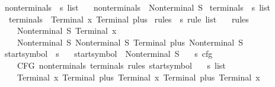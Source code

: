 \begin{isabellebody}
\ nonterminals\ {\isacharcolon}{\kern0pt}{\isacharcolon}{\kern0pt}\ {\isachardoublequoteopen}s\ list{\isachardoublequoteclose}\ \isanewline
\ \ {\isachardoublequoteopen}nonterminals\ {\isacharequal}{\kern0pt}\ {\isacharbrackleft}{\kern0pt}Nonterminal\ S{\isacharbrackright}{\kern0pt}{\isachardoublequoteclose}\isanewline
\isanewline
{}\isamarkupfalse%
\ terminals\ {\isacharcolon}{\kern0pt}{\isacharcolon}{\kern0pt}\ {\isachardoublequoteopen}s\ list{\isachardoublequoteclose}\ \isanewline
\ \ {\isachardoublequoteopen}terminals\ {\isacharequal}{\kern0pt}\ {\isacharbrackleft}{\kern0pt}Terminal\ x{\isacharcomma}{\kern0pt}\ Terminal\ plus{\isacharbrackright}{\kern0pt}{\isachardoublequoteclose}\isanewline
\isanewline
{}\isamarkupfalse%
\ rules\ {\isacharcolon}{\kern0pt}{\isacharcolon}{\kern0pt}\ {\isachardoublequoteopen}s\ rule\ list{\isachardoublequoteclose}\ \isanewline
\ \ {\isachardoublequoteopen}rules\ {\isacharequal}{\kern0pt}\ {\isacharbrackleft}{\kern0pt}\isanewline
\ \ \ \ {\isacharparenleft}{\kern0pt}Nonterminal\ S{\isacharcomma}{\kern0pt}\ {\isacharbrackleft}{\kern0pt}Terminal\ x{\isacharbrackright}{\kern0pt}{\isacharparenright}{\kern0pt}{\isacharcomma}{\kern0pt}\isanewline
\ \ \ \ {\isacharparenleft}{\kern0pt}Nonterminal\ S{\isacharcomma}{\kern0pt}\ {\isacharbrackleft}{\kern0pt}Nonterminal\ S{\isacharcomma}{\kern0pt}\ Terminal\ plus{\isacharcomma}{\kern0pt}\ Nonterminal\ S{\isacharbrackright}{\kern0pt}{\isacharparenright}{\kern0pt}\isanewline
\ \ {\isacharbrackright}{\kern0pt}{\isachardoublequoteclose}\isanewline
\isanewline
{}\isamarkupfalse%
\ start{\isacharunderscore}{\kern0pt}symbol\ {\isacharcolon}{\kern0pt}{\isacharcolon}{\kern0pt}\ s\ \isanewline
\ \ {\isachardoublequoteopen}start{\isacharunderscore}{\kern0pt}symbol\ {\isacharequal}{\kern0pt}\ Nonterminal\ S{\isachardoublequoteclose}\isanewline
\isanewline
{}\isamarkupfalse%
\ {\isasymG}\ {\isacharcolon}{\kern0pt}{\isacharcolon}{\kern0pt}\ {\isachardoublequoteopen}s\ cfg{\isachardoublequoteclose}\ \isanewline
\ \ {\isachardoublequoteopen}{\isasymG}\ {\isacharequal}{\kern0pt}\ CFG\ nonterminals\ terminals\ rules\ start{\isacharunderscore}{\kern0pt}symbol{\isachardoublequoteclose}\isanewline
\isanewline
{}\isamarkupfalse%
\ {\isasymomega}\ {\isacharcolon}{\kern0pt}{\isacharcolon}{\kern0pt}\ {\isachardoublequoteopen}s\ list{\isachardoublequoteclose}\ \isanewline
\ \ {\isachardoublequoteopen}{\isasymomega}\ {\isacharequal}{\kern0pt}\ {\isacharbrackleft}{\kern0pt}Terminal\ x{\isacharcomma}{\kern0pt}\ Terminal\ plus{\isacharcomma}{\kern0pt}\ Terminal\ x{\isacharcomma}{\kern0pt}\ Terminal\ plus{\isacharcomma}{\kern0pt}\ Terminal\ x{\isacharbrackright}{\kern0pt}{\isachardoublequoteclose}\isanewline

\end{isabellebody}
